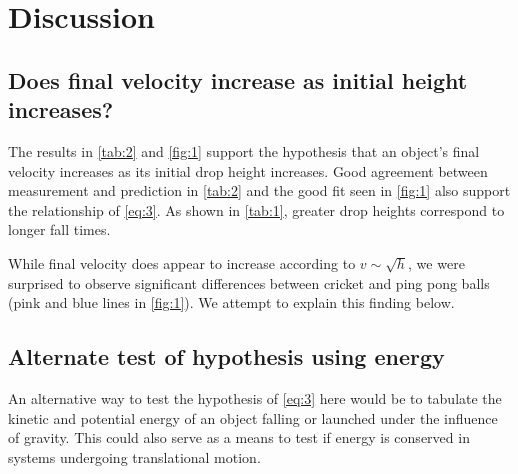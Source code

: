 \documentclass[reprint,amsmath,amssymb,aps,twoside]{revtex4-2}
\begin{document}
\section{Discussion}
\subsection{Does final velocity increase as initial height increases?}
The results in \cref{tab:2} and \cref{fig:1} support the hypothesis that an object’s final velocity increases as its initial drop height increases. Good agreement between measurement and prediction in \cref{tab:2} and the good fit seen in \cref{fig:1} also support the relationship of \cref{eq:3}. As shown in \cref{tab:1}, greater drop heights correspond to longer fall times. 

While final velocity does appear to increase according to $v\sim\sqrt{h}$, we were surprised to observe significant differences between cricket and ping pong balls (pink and blue lines in \cref{fig:1}). We attempt to explain this finding below.  

\subsection{Alternate test of hypothesis using energy}
An alternative way to test the hypothesis of \cref{eq:3} here would be to tabulate the kinetic and potential energy of an object falling or launched under the influence of gravity. This could also serve as a means to test if energy is conserved in systems undergoing translational motion.

\end{document}
